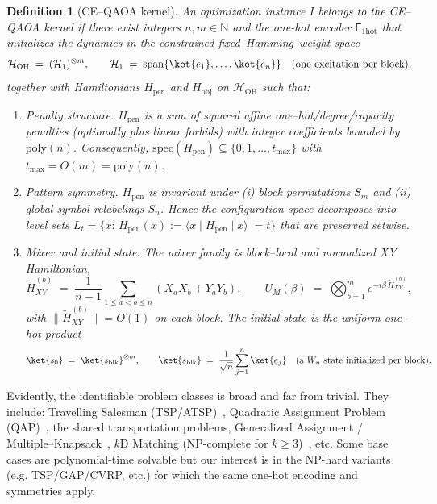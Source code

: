 \documentclass[a4paper,onecolumn,11pt,unpublished]{quantumarticle}
\newtheorem{definition}[theorem]{Definition}
\theoremstyle{remark}
\newcommand{\OH}{\mathcal{H}_{\mathrm{OH}}}
\begin{document}
\begin{definition}[CE--QAOA kernel]
\label{def:kernel-requirement}
An optimization instance $I$ belongs to the \emph{CE--QAOA kernel} if there exist
integers $n,m\in\mathbb N$ and the \emph{one-hot} encoder $\mathsf E_{\mathrm{1hot}}$
that initializes the dynamics in the constrained fixed–Hamming–weight space
\[
\OH \;=\; (\mathcal H_1)^{\otimes m},
\qquad
\mathcal H_1 \;=\; \mathrm{span}\{\ket{e_1},\dots,\ket{e_n}\}
\quad\text{(one excitation per block)},
\]
together with Hamiltonians $H_{\mathrm{pen}}$ and $H_{\mathrm{obj}}$ on $\OH$
such that:
\begin{enumerate}[label=\textup{(\alph*)}, leftmargin=2.2em]
\item \emph{Penalty structure.} $H_{\mathrm{pen}}$ is a sum of squared affine
      one–hot/degree/capacity penalties (optionally plus linear forbids) with
      integer coefficients bounded by $\mathrm{poly}(n)$. Consequently,
      $\mathrm{spec}(H_{\mathrm{pen}})\subseteq\{0,1,\dots,t_{\max}\}$ with
      $t_{\max}=O(m)=\mathrm{poly}(n)$.
\item \emph{Pattern symmetry.} $H_{\mathrm{pen}}$ is invariant under
      (i) block permutations $S_m$ and (ii) global symbol relabelings $S_n$.
      Hence the configuration space decomposes into level sets
      $L_t=\{x:\, H_{\mathrm{pen}}(x) :=\langle x \mid H_{\mathrm{pen}} \mid x \rangle \;=t\}$ that are preserved setwise.
\item \emph{Mixer and initial state.} The mixer family is block–local and normalized XY Hamiltonian,
      \[
      \widetilde H_{XY}^{(b)} \;=\;
      \frac{1}{n-1}\sum_{1\le a<b\le n}(X_aX_b+Y_aY_b),
      \qquad
      U_M(\beta) \;=\; \bigotimes_{b=1}^{m} e^{-i\beta\,\widetilde H_{XY}^{(b)}},
      \]
      with $\|\widetilde H_{XY}^{(b)}\|=O(1)$ on each block. The initial state is the
      uniform one–hot product
      \[
      \ket{s_0}\;=\;\ket{s_{\mathrm{blk}}}^{\otimes m},
      \qquad
      \ket{s_{\mathrm{blk}}}\;=\;\frac{1}{\sqrt n}\sum_{j=1}^n \ket{e_j}
      \quad\text{(a $W_n$ state initialized per block)}.
      \]
\end{enumerate}

\end{definition}

Evidently, the identifiable problem classes is broad and far from trivial. They include: Travelling Salesman (TSP/ATSP)~\cite{Lawler1985TSP,GareyJohnson1979}, Quadratic Assignment Problem (QAP)~\cite{Loiola2007QAPSurvey}, the shared transportation problems\cite{onah2025waas}, Generalized Assignment / Multiple–Knapsack~\cite{SahniGonzalez1976GAP}, $k$D Matching (NP-complete for $k\ge3$)~\cite{Karp1972}, etc. Some base cases are polynomial-time solvable but our interest is in the NP-hard variants (e.g. TSP/GAP/CVRP, etc.) for which the same one-hot encoding and symmetries apply.
\end{document}
